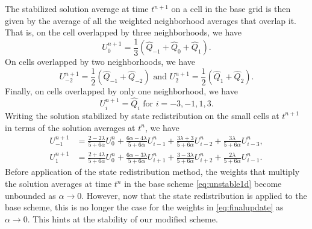 The stabilized solution average at time $t^{n+1}$ on a cell in the base grid is then given by the average of all the weighted neighborhood averages that overlap it.  That is, on the cell overlapped by three neighborhoods, we have
\begin{equation} \label{eq:threeneigh}
U^{n+1}_{0} = \frac{1}{3}(\widehat{Q}_{-1}+\widehat{Q}_{0}+\widehat{Q}_{1}).
\end{equation}
On cells overlapped by two neighborhoods, we have
\begin{equation} \label{eq:twoneigh}
U^{n+1}_{-2} = \frac{1}{2}(\widehat{Q}_{-1}+\widehat{Q}_{-2}) \text{ and } U^{n+1}_{2} = \frac{1}{2}(\widehat{Q}_{1}+\widehat{Q}_{2}).
\end{equation}
Finally, on cells overlapped by only one neighborhood,  we have
\begin{equation} \label{eq:oneneigh}
	U^{n+1}_i = \widehat{Q}_i \text{ for } i = -3,-1,1,3.
\end{equation}
Writing the solution stabilized by state redistribution on the small cells at $t^{n+1}$ in terms of the solution averages at $t^{n}$, we have
\begin{equation}
\begin{aligned}
U^{n+1}_{-1} &= \frac{2-2\lambda}{5+6\alpha}U^n_0 + \frac{6\alpha - 4 \lambda}{5+6\alpha}U^n_{i-1}+ \frac{3\lambda + 3}{5+6\alpha}U^n_{i-2}+\frac{3\lambda }{5+6\alpha}U^n_{i-3}, \\
U^{n+1}_{1} &= \frac{2+4\lambda}{5+6\alpha}U^n_0 + \frac{6\alpha - 3 \lambda}{5+6\alpha}U^n_{i+1}+ \frac{3-3\lambda}{5+6\alpha}U^n_{i+2}+\frac{2\lambda }{5+6\alpha}U^n_{i-1}.
\end{aligned} \label{eq:finalupdate}
\end{equation}
Before application of the state redistribution method, the weights that multiply the solution averages at time $t^n$ in the base scheme \eqref{eq:unstable1d} become unbounded as $\alpha \rightarrow 0$.
However, now that the state redistribution is applied to the base scheme, this is no longer the case for the weights in \eqref{eq:finalupdate} as $\alpha \rightarrow 0$.  This hints at the stability of our modified scheme.  

